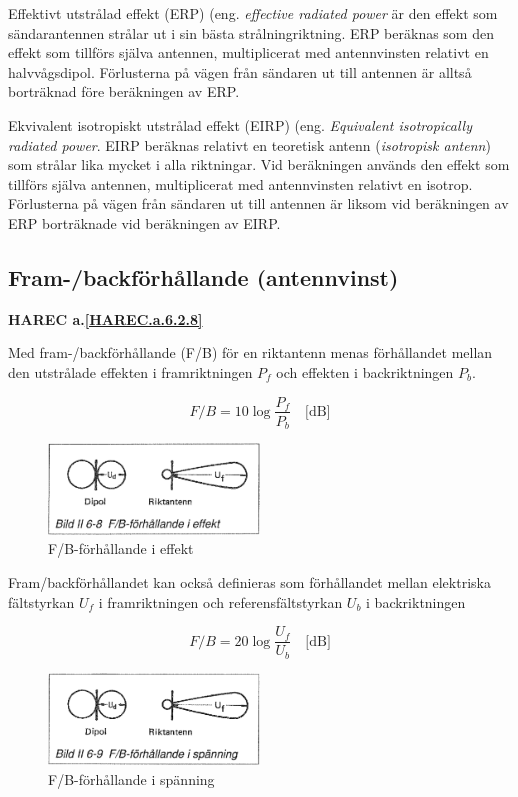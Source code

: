 Effektivt utstrålad effekt (ERP) (eng. \emph{effective radiated power} är den
effekt som sändarantennen strålar ut i sin bästa
strålningriktning. ERP beräknas som den effekt som tillförs själva
antennen, multiplicerat med antennvinsten relativt en
halvvågsdipol. Förlusterna på vägen från sändaren ut till antennen är
alltså borträknad före beräkningen av ERP.

Ekvivalent isotropiskt utstrålad effekt (EIRP) (eng. \emph{Equivalent isotropically radiated power}.
EIRP beräknas relativt en teoretisk antenn (\emph{isotropisk antenn}) som 
strålar lika mycket i alla riktningar. Vid beräkningen används den effekt
som tillförs själva antennen, multiplicerat med antennvinsten relativt en
isotrop. Förlusterna på vägen från sändaren ut till antennen är liksom vid beräkningen av ERP borträknade vid beräkningen av EIRP.

\subsection{Fram-/backförhållande (antennvinst)}
\textbf{
HAREC a.\ref{HAREC.a.6.2.8}\label{myHAREC.a.6.2.8}
}

Med fram-/backförhållande (F/B) för en riktantenn menas förhållandet
mellan den utstrålade effekten i framriktningen \(P_f\) och effekten i
backriktningen \(P_b\).

\[ F/B = 10 \log\frac{P_f}{P_b} \quad \text{[dB]} \]

\begin{figure}
  \includegraphics[width=0.5\textwidth]{images/bild_2_6-08}
  \caption{F/B-förhållande i effekt}
  \label{fig:bildII6-8}
\end{figure}

Fram/backförhållandet kan också definieras som förhållandet mellan
elektriska fältstyrkan \(U_f\) i framriktningen och
referensfältstyrkan \(U_b\) i backriktningen

\[ F/B = 20 \log\frac{U_f}{U_b} \quad \text{[dB]} \]

\begin{figure}
  \includegraphics[width=0.5\textwidth]{images/bild_2_6-09}
  \caption{F/B-förhållande i spänning}
  \label{fig:bildII6-9}
\end{figure}

